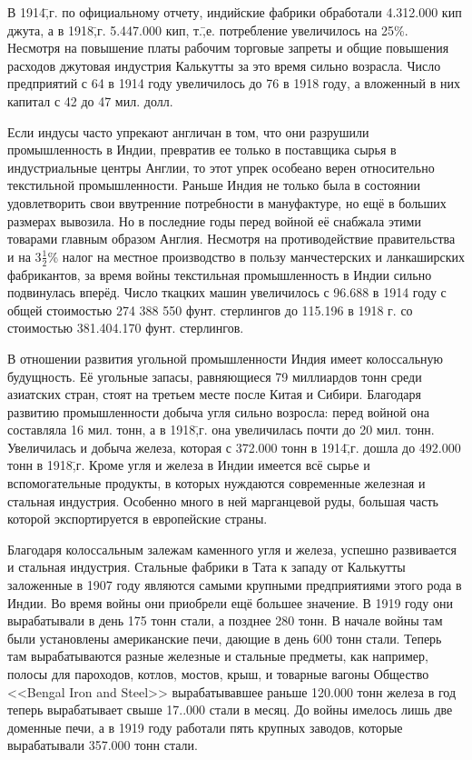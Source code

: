 В 1914\=,г. по официальному отчету, индийские фабрики обработали 4.312.000 кип джута, а в 1918\=,г. 5.447.000 кип, т.\=,е. потребление увеличилось на 25\%. Несмотря на повышение платы рабочим торговые запреты и общие повышения расходов джутовая индустрия Калькутты за это время сильно возрасла. Число предприятий с 64 в 1914 году увеличилось до 76 в 1918 году, а вложенный в них капитал с 42 до 47 мил. долл.

Если индусы часто упрекают англичан в том, что они разрушили промышленность в Индии, превратив ее только в поставщика сырья в индустриальные центры Англии, то этот упрек особеано верен относительно текстильной промышленности. Раньше Индия не только была в состоянии удовлетворить свои ввутренние потребности в мануфактуре, но ещё в больших размерах вывозила. Но в последние годы перед войной её снабжала этими товарами главным образом Англия. Несмотря на противодействие правительства и на $ 3\tfrac{1}{2} $\% налог на местное производство в пользу манчестерских и ланкаширских фабрикантов, за время войны текстильная промышленность в Индии сильно подвинулась вперёд. Число ткацких машин увеличилось с 96.688 в 1914 году с общей стоимостью 274 388 550 фунт. стерлингов до 115.196 в 1918 г. со стоимостью 381.404.170 фунт. стерлингов.

В отношении развития угольной промышленности Индия имеет колоссальную будущность. Её угольные запасы, равняющиеся 79 миллиардов тонн среди азиатских стран, стоят на третьем месте после Китая и Сибири. Благодаря развитию промышленности добыча угля сильно возросла: перед войной она составляла 16 мил. тонн, а в 1918\=,г. она увеличилась почти до 20 мил. тонн. Увеличилась и добыча железа, которая с 372.000 тонн в 1914\=,г. дошла до 492.000 тонн в 1918\=,г. Кроме угля и железа в Индии имеется всё сырье и вспомогательные продукты, в которых нуждаются современные железная и стальная индустрия. Особенно много в ней марганцевой руды, большая часть которой экспортируется в европейские страны.

Благодаря колоссальным залежам каменного угля и железа, успешно развивается и стальная индустрия. Стальные фабрики в Тата к западу от Калькутты заложенные в 1907 году являются самыми крупными предприятиями этого рода в Индии. Во время войны они приобрели ещё большее значение. В 1919 году они вырабатывали в день 175 тонн стали, а позднее 280 тонн. В начале войны там были установлены американские печи, дающие в день 600 тонн стали. Теперь там вырабатываются разные железные и стальные предметы, как например, полосы для пароходов, котлов, мостов, крыш, и товарные вагоны Общество <<Bengal Iron and Steel>> вырабатывавшее раньше 120.000 тонн железа в год теперь вырабатывает свыше 17..000 стали в месяц. До войны имелось лишь две доменные печи, а в 1919 году работали пять крупных заводов, которые вырабатывали 357.000 тонн стали.

